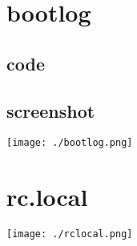 \documentclass[a4paper,10pt]{article}
\begin{document}
\section{bootlog}
\subsection{code}

\subsection{screenshot}
  \begin{center}
  \texttt{[image: ./bootlog.png]}
  \end{center}

\section{rc.local}
  \begin{center}
  \texttt{[image: ./rclocal.png]}
  \end{center}
\end{document}
